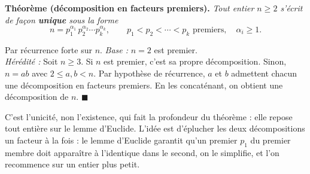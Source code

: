 \begin{tcolorbox}[thmbox]
  \textbf{Théorème (décomposition en facteurs premiers).}\enspace%
  \textit{Tout entier $n \geq 2$ s'écrit de façon \textbf{unique} sous la forme}
  \[
    n = p_1^{\alpha_1}\, p_2^{\alpha_2} \cdots p_k^{\alpha_k},
    \qquad p_1 < p_2 < \cdots < p_k \text{ premiers},\quad \alpha_i \geq 1.
  \]
\end{tcolorbox}


\begin{mdframed}[style=proofbar]
  Par récurrence forte sur $n$.
  \textit{Base :} $n=2$ est premier. \\
  \textit{Hérédité :} Soit $n \geq 3$. Si $n$ est premier, c'est sa propre décomposition.
  Sinon, $n = ab$ avec $2 \leq a,b < n$. Par hypothèse de récurrence, $a$ et $b$
  admettent chacun une décomposition en facteurs premiers. En les concaténant,
  on obtient une décomposition de $n$.
  $\blacksquare$
\end{mdframed}


\begin{ideepreuve}
  C'est l'unicité, non l'existence, qui fait la profondeur du théorème : elle repose
  tout entière sur le lemme d'Euclide. L'idée est d'éplucher les deux décompositions
  un facteur à la fois : le lemme d'Euclide garantit qu'un premier $p_1$ du premier
  membre doit apparaître à l'identique dans le second, on le simplifie, et l'on
  recommence sur un entier plus petit.
\end{ideepreuve}

